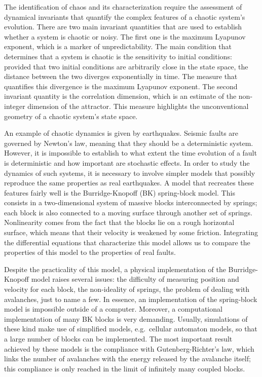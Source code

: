 The identification of chaos and its characterization require the assessment of dynamical invariants
that quantify the complex features of a chaotic system's evolution. There are two main invariant
quantities that are used to establish whether a system is chaotic or noisy.
The first one is the maximum Lyapunov exponent, which is a marker of unpredictability. The main
condition that determines that a system is chaotic is the sensitivity to initial conditions:
provided that two initial conditions are arbitrarily close in the state space, the distance
between the two diverges exponentially in time. The measure that quantifies this divergence is the
maximum Lyapunov exponent. The second invariant quantity is the correlation dimension, which is an
estimate of the non-integer dimension of the attractor. This measure highlights the unconventional
geometry of a chaotic system's state space.

An example of chaotic dynamics is given by earthquakes. Seismic faults are governed by Newton's law,
meaning that they should be a deterministic system. However, it is impossible to establish to what
extent the time evolution of a fault is deterministic and how important are stochastic effects.
In order to study the dynamics of such systems, it is necessary to involve simpler models that
possibly reproduce the same properties as real earthquakes. A model that recreates these
features fairly well is the Burridge-Knopoff (BK) spring-block model. This consists in a two-dimensional
system of massive blocks interconnected by springs; each block is also connected to a moving surface
through another set of springs. Nonlinearity comes from the fact that the blocks lie on a rough
horizontal surface, which means that their velocity is weakened by some friction. Integrating the
differential equations that characterize this model allows us to compare the properties of this model
to the properties of real faults.

Despite the practicality of this model, a physical implementation of the Burridge-Knopoff model raises
several issues: the difficulty of measuring position and velocity for each block, the non-ideality
of springs, the problem of dealing with avalanches, just to name a few. In essence, an implementation
of the spring-block model is impossible outside of a computer. Moreover, a computational implementation
of many BK blocks is very demanding. Usually, simulations of these kind make use of simplified models,
e.g.\ cellular automaton models, so that a large number of blocks can be implemented.
The most important result achieved by these models is the compliance with Gutenberg-Richter's law, which
links the number of avalanches with the energy released by the avalanche itself; this compliance is only
reached in the limit of infinitely many coupled blocks.


